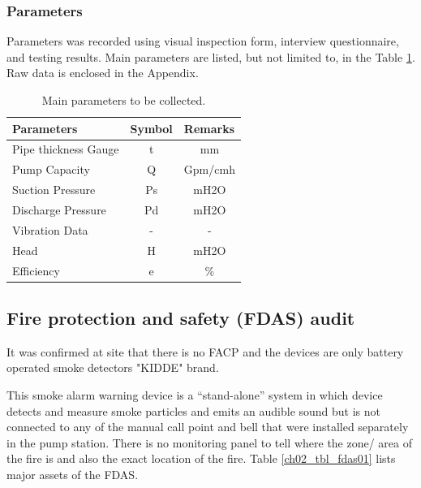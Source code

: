 \subsubsection{Parameters}
Parameters was recorded using visual inspection form, interview questionnaire, and testing results. Main parameters are listed, but not limited to, in the Table \ref{ch02_tbl_parameter}. Raw data is enclosed in the Appendix.

\begin{table}[h]
	\caption{Main parameters to be collected.}
	\label{ch02_tbl_parameter}
	{\footnotesize
\begin{tabular}{l|l|l}
	\hline
	Parameters & \multicolumn{1}{c|}{Symbol} & Remarks \\ 
	\hline
	Pipe thickness Gauge & \multicolumn{1}{c|}{t} & \multicolumn{1}{c}{mm} \\ 
	Pump Capacity & \multicolumn{1}{c|}{Q} & \multicolumn{1}{c}{Gpm/cmh} \\ 
	Suction Pressure  & \multicolumn{1}{c|}{Ps} & \multicolumn{1}{c}{mH2O} \\ 
	Discharge Pressure & \multicolumn{1}{c|}{Pd} & \multicolumn{1}{c}{mH2O} \\ 
	Vibration Data  & \multicolumn{1}{c|}{-} & \multicolumn{1}{c}{-} \\ 
	Head & \multicolumn{1}{c|}{H} & \multicolumn{1}{c}{mH2O} \\ 
	Efficiency  & \multicolumn{1}{c|}{e} & \multicolumn{1}{c}{\%} \\ 
		\hline
	\end{tabular}		
	}
\end{table}


\subsection{Fire protection and safety (FDAS) audit}
\label{234}
It was confirmed at site that there is no FACP and the devices are only battery operated smoke detectors "KIDDE" brand. 

This smoke alarm warning device is a “stand-alone” system in which device detects and measure smoke particles and emits an audible sound but is not connected to any of the manual call point and bell that were installed separately in the pump station. There is no monitoring panel to tell where the zone/ area of the fire is and also the exact location of the fire. Table \ref{ch02_tbl_fdas01} lists major assets of the FDAS.

